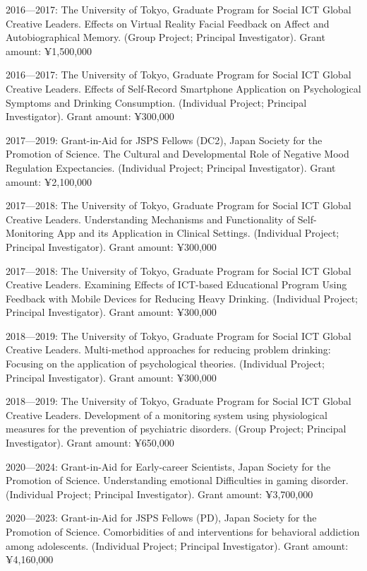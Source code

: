 \documentclass[a4paper]{article}
\begin{document}
\begin{description}
	\item 2016---2017: The University of Tokyo, Graduate Program for Social ICT Global Creative Leaders. Effects on Virtual Reality Facial Feedback on Affect and Autobiographical Memory. (Group Project; Principal Investigator). Grant amount: ¥1,500,000
	\item 2016---2017: The University of Tokyo, Graduate Program for Social ICT Global Creative Leaders. Effects of Self-Record Smartphone Application on Psychological Symptoms and Drinking Consumption. (Individual Project; Principal Investigator). Grant amount: ¥300,000
	\item 2017---2019: Grant-in-Aid for JSPS Fellows (DC2), Japan Society for the Promotion of Science. The Cultural and Developmental Role of Negative Mood Regulation Expectancies. (Individual Project; Principal Investigator). Grant amount: ¥2,100,000
	\item 2017---2018: The University of Tokyo, Graduate Program for Social ICT Global Creative Leaders. Understanding Mechanisms and Functionality of Self-Monitoring App and its Application in Clinical Settings. (Individual Project; Principal Investigator). Grant amount: ¥300,000
	\item 2017---2018: The University of Tokyo, Graduate Program for Social ICT Global Creative Leaders. Examining Effects of ICT-based Educational Program Using Feedback with Mobile Devices for Reducing Heavy Drinking. (Individual Project; Principal Investigator). Grant amount: ¥300,000
	\item 2018---2019: The University of Tokyo, Graduate Program for Social ICT Global Creative Leaders. Multi-method approaches for reducing problem drinking: Focusing on the application of psychological theories. (Individual Project; Principal Investigator). Grant amount: ¥300,000
	\item 2018---2019: The University of Tokyo, Graduate Program for Social ICT Global Creative Leaders. Development of a monitoring system using physiological measures for the prevention of psychiatric disorders. (Group Project; Principal Investigator). Grant amount: ¥650,000
	\item 2020---2024: Grant-in-Aid for Early-career Scientists, Japan Society for the Promotion of Science. Understanding emotional Difficulties in gaming disorder. (Individual Project; Principal Investigator). Grant amount: ¥3,700,000
	\item 2020---2023: Grant-in-Aid for JSPS Fellows (PD), Japan Society for the Promotion of Science. Comorbidities of and interventions for behavioral addiction among adolescents. (Individual Project; Principal Investigator). Grant amount: ¥4,160,000

\end{description}
\end{document}
